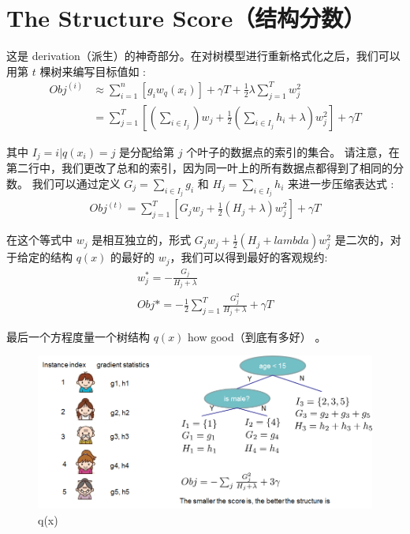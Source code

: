 \documentclass{article}
\begin{document}
\section{The Structure Score（结构分数）}
这是 derivation（派生）的神奇部分。在对树模型进行重新格式化之后，我们可以用第 $t$ 棵树来编写目标值如 :
\begin{equation*}
	\begin{split}
		Obj^{(i)}&\approx\sum_{i=1}^n[g_iw_q(x_i)]+\gamma T+\frac{1}{2}\lambda\sum_{j=1}^Tw_j^2\\
		&=\sum_{j=1}^T[(\sum_{i\in I_j})w_j+\frac{1}{2}(\sum_{i\in I_j}h_i+\lambda)w^2_j]+\gamma T
	\end{split}
\end{equation*}

其中 $I_j={i|q(x_i)=j}$ 是分配给第 $j$ 个叶子的数据点的索引的集合。 请注意，在第二行中，我们更改了总和的索引，因为同一叶上的所有数据点都得到了相同的分数。 我们可以通过定义 $G_j=\sum_{i\in I_j}g_i$ 和 $H_j=\sum_{i\in I_j}h_i$ 来进一步压缩表达式 :
\begin{equation*}
	\begin{split}
		Obj^{(t)}=\sum_{j=1}^T[G_jw_j+\frac{1}{2}(H_j+\lambda)w_j^2]+\gamma T
	\end{split}
\end{equation*}

在这个等式中 $w_j$ 是相互独立的，形式 $G_jw_j+\frac{1}{2}(H_j+lambda)w_j^2$ 是二次的，对于给定的结构 $q(x)$ 的最好的 $w_j$，我们可以得到最好的客观规约:
\begin{equation*}
	\begin{split}
		w_j^*=-\frac{G_j}{H_j+\lambda}\\
		Obj*=-\frac{1}{2}\sum_{j=1}^T\frac{G_j^2}{H_j+\lambda}+\gamma T
	\end{split}
\end{equation*}

最后一个方程度量一个树结构 $q(x)$ how good（到底有多好） 。
\begin{figure}[H]
	\centering
	\includegraphics[scale=0.5]{struct_score.png}
	\caption{q(x)}
\end{figure}
\end{document}
